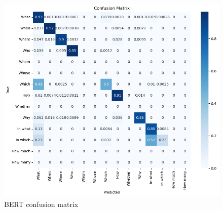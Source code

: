 \documentclass{article}
\begin{document}
\begin{figure}[ht]
    \centering
    \includegraphics[width=0.75\linewidth]{results/classification/conf bert.png}
    \caption{BERT confusion matrix}
    \label{fig:bert-conf}
\end{figure}
\end{document}
